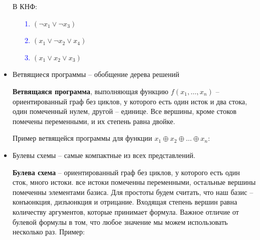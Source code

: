 \begin{itemize}
  В КНФ:
  \begin{enumerate}
    \item[\textcolor{blue}{1.}] $(\lnot x_1 \lor \lnot x_3)$
    \item[\textcolor{blue}{2.}] $(x_1 \lor \lnot x_2 \lor x_4)$
    \item[\textcolor{blue}{3.}] $(x_1 \lor x_2 \lor x_3)$
  \end{enumerate}
  \item Ветвящиеся программы -- обобщение дерева решений
  \begin{conj}
    \textbf{Ветвящаяся программа}, выполняющая функцию $f(x_1, \dots, x_n)$ -- ориентированный граф без циклов, 
    у которого есть один исток и два стока, один помеченный нулем, другой -- единице. Все вершины, кроме стоков помечены переменными, и 
    их степень равна двойке. 
  \end{conj}
  Пример ветвящейся программы для функции $x_1 \oplus x_2 \oplus \dots \oplus x_n$:
   \begin{center}
   \end{center}
  \item Булевы схемы -- самые компактные из всех представлений. 
  \begin{conj}
    \textbf{Булева схема} -- ориентированный граф без циклов, у которого 
    есть один сток, много истоки. все истоки помеченны переменными, остальные вершины помеченны элементами базиса. 
    Для простоты будем считать, что наш базис -- конъюнкция, дизъюнкция и отрицание. Входящая степень вершин равна
    количеству аргументов, которые принимает формула. Важное отличие от булевой формулы в том, что любое значение мы можем использовать 
    несколько раз. Пример:

\end{conj}
\end{itemize}
